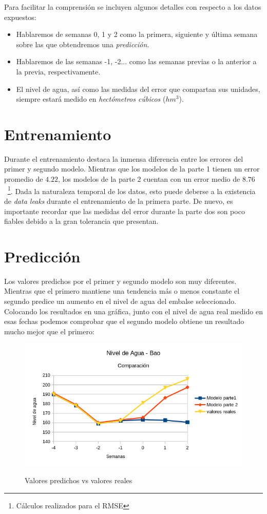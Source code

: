 \documentclass[12pt]{report} %
\begin{document}
Para facilitar la comprensión se incluyen algunos detalles con respecto a los datos expuestos:
\begin{itemize}
    \item Hablaremos de semanas 0, 1 y 2 como la primera, siguiente y última semana sobre las que obtendremos una \textit{predicción}.
    \item Hablaremos de las semanas -1, -2... como las semanas previas o la anterior a la previa, respectivamente.
    \item El nivel de agua, así como las medidas del error que compartan sus unidades, siempre estará medido en \textit{hectómetros cúbicos} ($hm^3$).
\end{itemize}

\section{Entrenamiento}

Durante el entrenamiento destaca la inmensa diferencia entre los errores del primer y segundo modelo. Mientras que los modelos de la parte 1 tienen un error promedio de $4.22$, los modelos de la parte 2 cuentan con un error medio de $8.76$~\footnote{Cálculos realizados para el RMSE}. Dada la naturaleza temporal de los datos, esto puede deberse a la existencia de \textit{data leaks} durante el entrenamiento de la primera parte. De nuevo, es importante recordar que las medidas del error durante la parte dos son poco fiables debido a la gran tolerancia que presentan.

\section{Predicción}

Los valores predichos por el primer y segundo modelo son muy diferentes. Mientras que el primero mantiene una tendencia más o menos constante el segundo predice un aumento en el nivel de agua del embalse seleccionado. Colocando los resultados en una gráfica, junto con el nivel de agua real medido en esas fechas podemos comprobar que el segundo modelo obtiene un resultado mucho mejor que el primero:

\begin{figure}[H]
    \includegraphics[width=0.85\linewidth]{predict-12-real.png}\\
    \caption{\small Valores predichos vs valores reales}
\end{figure}
\end{document}
